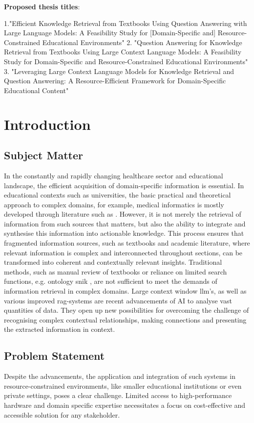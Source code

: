\textbf{Proposed thesis titles}:

1."Efficient Knowledge Retrieval from Textbooks Using Question Answering with Large Language Models: A Feasibility Study for [Domain-Specific and] Resource-Constrained Educational Environments"
%
2. "Question Answering for Knowledge Retrieval from Textbooks Using Large Context Language Models: 
A Feasibility Study for Domain-Specific and Resource-Constrained Educational Environments"
%
3. "Leveraging Large Context Language Models for Knowledge Retrieval and Question Answering: 
A Resource-Efficient Framework for Domain-Specific Educational Content"
\chapter{Introduction}\label{ch:introduction}
\section{Subject Matter}
In the constantly and rapidly changing healthcare sector and educational landscape, the efficient acquisition of domain-specific information is essential. 
In educational contexts such as universities, the basic practical and theoretical approach to complex domains, for example, medical informatics is mostly developed through literature such as \citet{bb2}.
However, it is not merely the retrieval of information from such sources that matters, but also the ability to integrate and synthesise this information into actionable knowledge.
This process ensures that fragmented information sources, such as textbooks and academic literature, where relevant information is complex and interconnected throughout sections, can be transformed into coherent and contextually relevant insights.
Traditional methods, such as manual review of textbooks or reliance on limited search functions, e.g. ontology \ac{snik} \citep{semantischesnetz}, are not sufficient to meet the demands of information retrieval in complex domains.  
%
Large context window \ac{llm}'s, as well as various improved \ac{rag}-systems are recent advancements of AI to analyse vast quantities of data.
They open up new possibilities for overcoming the challenge of recognising complex contextual relationships, making connections and presenting the extracted information in context.
%
\section{Problem Statement}\label{ch:problem statement}
Despite the advancements, the application and integration of such systems in resource-constrained environments, like smaller educational institutions or even private settings, poses a clear challenge.
Limited access to high-performance hardware and domain specific expertise necessitates a focus on cost-effective and accessible solution for any stakeholder.
